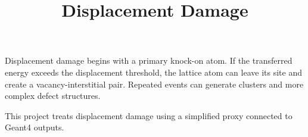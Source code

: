 \documentclass[11pt]{article}
\title{Displacement Damage}
\begin{document}
\maketitle

Displacement damage begins with a primary knock-on atom. If the transferred energy exceeds the displacement threshold, the lattice atom can leave its site and create a vacancy-interstitial pair. Repeated events can generate clusters and more complex defect structures.

This project treats displacement damage using a simplified proxy connected to Geant4 outputs.
\end{document}
